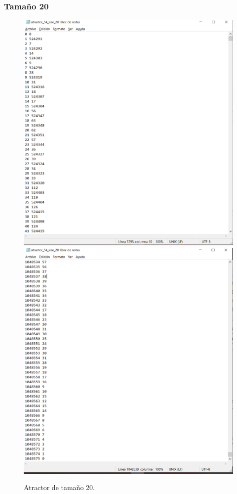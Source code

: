 \documentclass[11pt]{article}
\begin{document}
			\subsubsection{Tamaño 20}
			\begin{figure}[H]
			\centering
			\includegraphics[scale=0.3]{resources/Atractores54/atractor_54_size_20.png}
			\includegraphics[scale=0.3]{resources/Atractores54/atractor_54_size_201.png}
			\caption{Atractor de tamaño 20.}\label{fig:picture}
			\end{figure}
\end{document}
